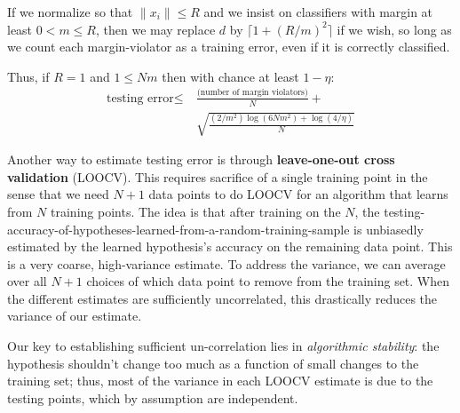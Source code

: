         If we normalize so that $\|x_i\|\leq R$ and we insist on classifiers
        with margin at least $0<m\leq R$, then we may replace $d$ by
        $\lceil 1+(R/m)^2 \rceil$ if we wish, so long as we count each
        margin-violator as a training error, even if it is correctly
        classified.


        Thus, if $R=1$ and $1 \leq Nm$ then with chance at least $1-\eta$:
        \begin{align*}
            \text{testing error} \leq &~\frac{\text{(number of margin violators)}}{N}
          +\\
            &~\sqrt{\frac{(2/m^2) \log(6N m^2) + \log(4/\eta)}{N}}
        \end{align*}



        Another way to estimate testing error is through \textbf{leave-one-out
        cross validation} (LOOCV).  This requires sacrifice of a single
        training point in the sense that we need $N+1$ data points to do LOOCV
        for an algorithm that learns from $N$ training points.
        The idea is that after training on the $N$, the
        testing-accuracy-of-hypotheses-learned-from-a-random-training-sample is
        unbiasedly estimated by the learned hypothesis's accuracy on the
        remaining data point.  This is a very coarse, high-variance estimate.
        To address the variance, we can average over all $N+1$
        choices
        of which data point to remove from the training set.  When the
        different estimates are sufficiently uncorrelated, this drastically
        reduces the variance of our estimate.

        Our key to establishing sufficient un-correlation lies in
        \emph{algorithmic stability}: the hypothesis shouldn't change too much
        as a function of small changes to the training set; thus, most of the
        variance in each LOOCV estimate is due to the testing points, which by
        assumption are independent.

